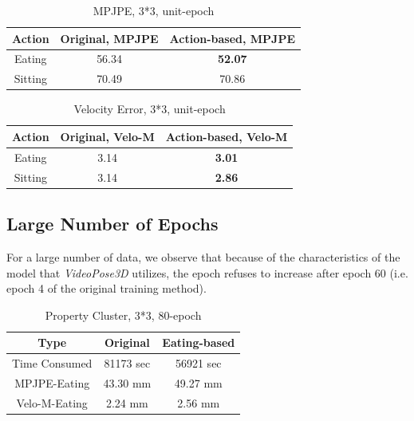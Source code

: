 \documentclass[10pt,twocolumn,letterpaper]{article}
\begin{document}
\begin{table}[H]
\caption{MPJPE, 3*3, unit-epoch}

\begin{tabular}{ccc}

\hline
Action & Original, MPJPE & Action-based, MPJPE\\
\hline

Eating&  56.34 & \textbf{52.07}\\
Sitting& 70.49 & 70.86\\

\hline
\end{tabular}
\end{table}


\begin{table}[H]
\caption{Velocity Error, 3*3, unit-epoch}


\begin{tabular}{ccc}
\hline
Action & Original, Velo-M  & Action-based, Velo-M\\
\hline

Eating&  3.14 & \textbf{3.01}\\
Sitting& 3.14 & \textbf{2.86}\\

\hline
\end{tabular}
\end{table}


\subsection{Large Number of Epochs}

For a large number of data, we observe that because of the characteristics of the model that \textit{VideoPose3D}
utilizes, the epoch refuses to increase after epoch 60 (i.e. epoch 4 of the original training method). 


\begin{table}[H]
\caption{Property Cluster, 3*3, 80-epoch}
\centering
\begin{tabular}{ccc}
\hline
Type & Original  & Eating-based\\
\hline

Time Consumed&  81173 sec & 56921 sec\\
MPJPE-Eating&  43.30 mm & 49.27 mm\\
Velo-M-Eating&  2.24 mm & 2.56 mm  \\

\hline
\end{tabular}
\end{table}
\end{document}
